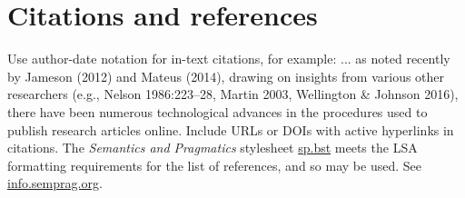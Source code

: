 \documentclass[12pt,letterpaper]{article}
\begin{document}
\section{Citations and references} Use author-date notation for in-text citations, for example: ... as noted recently by Jameson (2012) and Mateus (2014), drawing on insights from various other researchers (e.g., Nelson 1986:223–28, Martin 2003, Wellington \& Johnson 2016), there have been numerous technological advances in the procedures used to publish research articles online. Include URLs or DOIs with active hyperlinks in citations. The \textit{Semantics and Pragmatics} stylesheet \href{https://raw.githubusercontent.com/semprag/tex/master/sp.bst}{sp.bst} meets the LSA formatting requirements for the list of references, and so may be used. See \href{http://info.semprag.org}{info.semprag.org}. 
\setlength{\bibsep}{0pt plus 0.3ex}
\setlength{\bibhang}{0.3in}			%
\titleformat{\section}{\normalfont\bfseries}{\thesection}{.5em}{}		%

\newcommand{\doi}[1]{\href{http://dx.doi.org/#1}{http://dx.doi.org/#1}}	%
\end{document}
